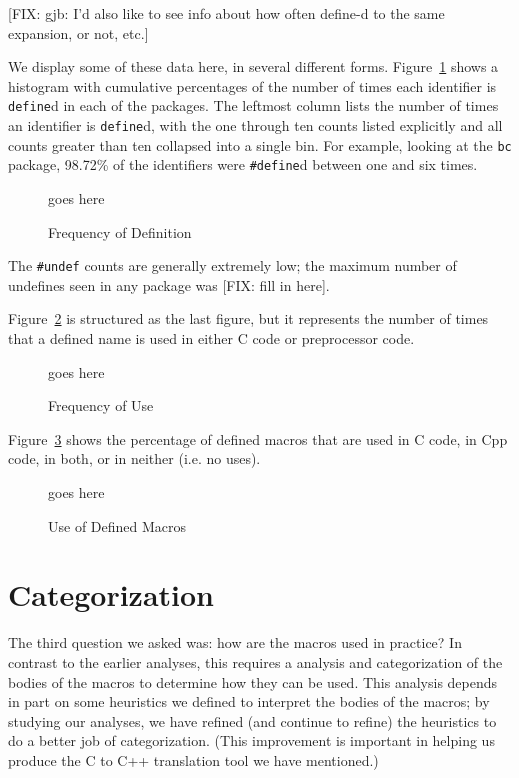 [FIX: gjb: I'd also like to see info about how often define-d to the same
expansion, or not, etc.]


We display some of these data here, in several different forms.
Figure~\ref{fig:define_count} shows a histogram with cumulative
percentages of the number of times each identifier is \verb+define+d
in each of the packages.  The leftmost column lists the number of
times an identifier is \verb+define+d, with the one through ten counts
listed explicitly and all counts greater than ten collapsed into a
single bin.  For example, looking at the \verb+bc+ package, 98.72\% of
the identifiers were \verb+#define+d between one and six times.

\begin{figure}
goes here

\caption{Frequency of Definition\label{fig:define_count}}
\end{figure}

The \verb+#undef+ counts are generally extremely low; the maximum
number of undefines seen in any package was [FIX: fill in here].

Figure~\ref{fig:use_count} is structured as the last figure, but it
represents the number of times that a defined name is used in either C
code or preprocessor code.

\begin{figure}
goes here

\caption{Frequency of Use\label{fig:use_count}}
\end{figure}

Figure~\ref{fig:define_usage} shows the percentage of defined macros
that are used in C code, in Cpp code, in both, or in neither (i.e. no
uses).

\begin{figure}
goes here

\caption{Use of Defined Macros\label{fig:define_usage}}
\end{figure}


\section{Categorization}\label{sec:categorization}

The third question we asked was: how are the macros used in practice?
In contrast to the earlier analyses, this requires a analysis and
categorization of the bodies of the macros to determine how they can
be used.  This analysis depends in part on some heuristics we defined
to interpret the bodies of the macros; by studying our analyses, we
have refined (and continue to refine) the heuristics to do a better
job of categorization.  (This improvement is important in helping us
produce the C to C++ translation tool we have mentioned.)

